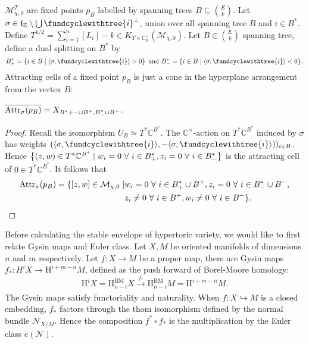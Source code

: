 \documentclass[b5paper]{article}
\newcommand{\MM}{\mathcal{M}}
\newcommand{\HH}{\mathrm{H}}
\newcommand{\Attr}{\textnormal{Attr}_\sigma}
\newcommand{\Chbar}{\mathbb{C}^\times _\hbar}
\begin{document}
$\MM_{\chi,0}^T$ are fixed points $p_B$ labelled by spanning trees $B\subseteq \binom{E}{k}$.
Let $\sigma\in \mathfrak{t}_\mathbb{Z}\setminus \bigcup\fundcyclewithtree{i}^\perp$, union over all spanning tree $B$ and $i\in B^*$. Define $T^{1/2}=\sum_{i=1}^{n}[L_i]-k \in K_{T\times \Chbar}(\MM_{\chi,0})$. Let $B\in \binom{E}{k}$ spanning tree, define a dual splitting on $B^*$ by
\[
    B^*_+=\CB{i\in B\mid \AB{\sigma,\fundcyclewithtree{i}}>0}\textnormal{ and }B^*_-=\CB{i\in B\mid \AB{\sigma,\fundcyclewithtree{i}}<0}.
\]
Attracting cells of a fixed point $p_B$ is just a cone in the hyperplane arrangement from the vertex $B$:
\begin{proposition}[pps:]{}
    $\overline{\Attr(p_B)}=X_{B^*+-\cup B^+,B^*_-\cup B^-}$.    
    \begin{proof}
        Recall the isomorphism $U_B\simeq T^*\mathbb{C}^{B^*}$. The $\mathbb{C}^\times $-action on $T^*\mathbb{C}^{B^*}$ induced by $\sigma$ has weights $(\AB{\sigma,\fundcyclewithtree{i}},-\AB{\sigma,\fundcyclewithtree{i}}))_{i\in B}$. Hence $\left\{(z,w)\in T^*\mathbb{C}^{B^*}\mid w_i=0\ \forall\ i\in B^*_+, z_i=0\ \forall\ i\in B^*_-\right\}$ is the attracting cell of $0\in T^*\mathbb{C}^{B^*}$. It follows that 
        \begin{alignat*}{1}
            \Attr(p_B)=\{[z,w]\in \MM_{\chi,0}\mid &w_i=0\ \forall\ i\in B^*_+\cup B^+, z_i=0\ \forall\ i\in B^*_-\cup B^-,\\
                                                     &z_i\neq 0\ \forall\ i\in B^+, w_i\neq 0\ \forall\ i\in B^-\}.
        \end{alignat*}
    \end{proof}
\end{proposition}

Before calculating the stable envelope of hypertoric variety, we would like to first relate Gysin maps and Euler class. Let $X,M$ be oriented manifolds of dimensions $n$ and $m$ respectively. Let $f:X\rightarrow M$ be a proper map, there are Gysin maps $f_*:H^iX\rightarrow \HH^{i+m-n}M$, defined as the push forward of Borel-Moore homology:
\[
    \HH^iX=\HH^{\text{BM}}_{n-i}X\xrightarrow[]{f_*}\HH^{\text{BM}}_{n-i}M=\HH^{i+m-n}M.
\]
The Gysin maps satisfy functoriality and naturality. When $f:X\hookrightarrow M$ is a closed embedding, $f_*$ factors through the thom isomorphism defined by the normal bundle $\mathcal{N}_{X/M}$. Hence the composition $f^*\circ f_*$ is the multiplication by the Euler class $e(\mathcal{N})$.
\end{document}
